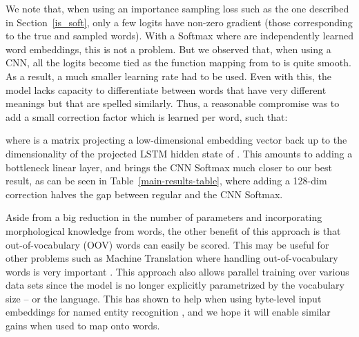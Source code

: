 \documentclass{article}
\begin{document}
We note that, when using an importance sampling loss such as the one described in Section~\ref{is_soft}, only a few logits have non-zero gradient (those corresponding to the true and sampled words). With a Softmax where  are independently learned word embeddings, this is not a problem. But we observed that, when using a CNN, all the logits become tied as the function mapping from  to  is quite smooth. As a result, a much smaller learning rate had to be used. Even with this, the model lacks capacity to differentiate between words that have very different meanings but that are spelled similarly. Thus, a reasonable compromise was to add a small correction factor which is learned per word, such that:


where  is a matrix projecting a low-dimensional embedding vector  back up to the dimensionality of the projected LSTM hidden state of . This amounts to adding a bottleneck linear layer, and brings the CNN Softmax much closer to our best result, as can be seen in Table~\ref{main-results-table}, where adding a 128-dim correction halves the gap between regular and the CNN Softmax.

Aside from a big reduction in the number of parameters and incorporating morphological knowledge from words, the other benefit of this approach is that out-of-vocabulary (OOV) words can easily be scored. This may be useful for other problems such as Machine Translation where handling out-of-vocabulary words is very important \cite{luong2014addressing}. This approach also allows parallel training over various data sets since the model is no longer explicitly parametrized by the vocabulary size -- or the language. This has shown to help when using byte-level input embeddings for named entity recognition \cite{gillick2015multilingual}, and we hope it will enable similar gains when used to map onto words.
\end{document}
